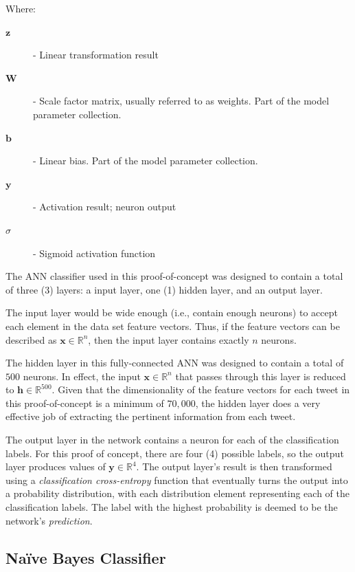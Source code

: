 \documentclass[conference]{sig-alternate-05-2015}
\begin{document}
\noindent Where:
\begin{description}
  \item[$\textbf{z}$] - Linear transformation result
  \item[$\textbf{W}$] - Scale factor matrix, usually referred to as weights.
  Part of the model parameter collection.
  \item[$\textbf{b}$] - Linear bias. Part of the model parameter collection.
  \item[$\textbf{y}$] - Activation result; neuron output
  \item[$\sigma$] - Sigmoid activation function 
\end{description}
\noindent\hrulefill

The ANN classifier used in this proof-of-concept was designed to contain a total
of three (3) layers: a input layer, one (1) hidden layer, and an output layer.

The input layer would be wide enough (i.e., contain enough
neurons) to accept each element in the data set feature vectors. Thus, if the
feature vectors can be described as $\textbf{x} \in \mathbb{R}^n$, then the
input layer contains exactly $n$ neurons. 

The hidden layer in this fully-connected ANN was designed to contain a total of
$500$ neurons. In effect, the input $\textbf{x} \in \mathbb{R}^n$ that passes
through this layer is reduced to $\textbf{h} \in \mathbb{R}^{500}$. Given that
the dimensionality of the feature vectors for each tweet in this
proof-of-concept is a minimum of $70,000$, the hidden layer does a very
effective job of extracting the pertinent information from each tweet.

The output layer in the network contains a neuron for each of the classification
labels. For this proof of concept, there are four (4) possible labels, so the
output layer produces values of $\textbf{y} \in \mathbb{R}^4$. The output
layer's result is then transformed using a \textit{classification cross-entropy}
function that eventually turns the output into a probability distribution, with
each distribution element representing each of the classification labels. The
label with the highest probability is deemed to be the network's
\textit{prediction}.

\subsection{Na\"ive Bayes Classifier}\label{subsec:naive_bayes_classifer}
\end{document}
